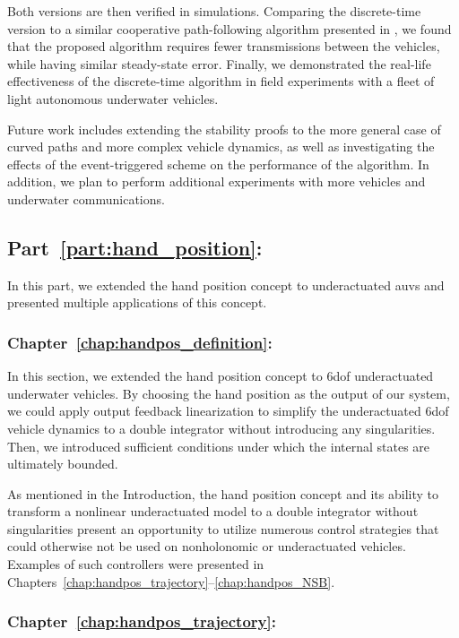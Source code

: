 Both versions are then verified in simulations.
Comparing the discrete-time version to a similar cooperative path-following algorithm presented in \cite{praveen_cooperative_2018}, we found 
that the proposed algorithm requires fewer transmissions between the vehicles, while having similar steady-state error.
Finally, we demonstrated the real-life effectiveness of the discrete-time algorithm in field experiments with a fleet of light autonomous underwater vehicles.

Future work includes extending the stability proofs to the more general case of curved paths and more complex vehicle dynamics, as well as investigating the effects of the event-triggered scheme on the performance of the algorithm.
In addition, we plan to perform additional experiments with more vehicles and underwater communications.

\subsection*{Part~\ref{part:hand_position}: }

In this part, we extended the hand position concept to underactuated \glspl{auv} and presented multiple applications of this concept.

\subsubsection{Chapter~\ref{chap:handpos_definition}: }

In this section, we extended the hand position concept to 6\gls{dof} underactuated underwater vehicles.
By choosing the hand position as the output of our system, we could apply output feedback linearization to simplify the underactuated 6\gls{dof} vehicle dynamics to a double integrator without introducing any singularities.
Then, we introduced sufficient conditions under which the internal states are ultimately bounded.

As mentioned in the Introduction, the hand position concept and its ability to transform a nonlinear underactuated model to a double integrator without singularities present an opportunity to utilize numerous control strategies that could otherwise not be used on nonholonomic or underactuated vehicles.
Examples of such controllers were presented in Chapters~\ref{chap:handpos_trajectory}--\ref{chap:handpos_NSB}.

\subsubsection{Chapter~\ref{chap:handpos_trajectory}: }

